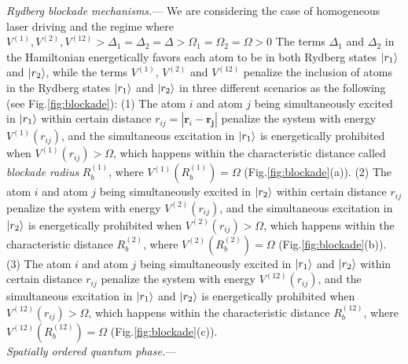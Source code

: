 \documentclass[%
 reprint,
nofootinbib,
 amsmath,amssymb,
 aps,
floatfix,
]{revtex4-2}
\begin{document}
\emph{Rydberg blockade mechanisms.}--- We are considering the case of homogeneous laser driving and the regime where $V^{(1)},V^{(2)},V^{(12)} > \Delta_1=\Delta_2 =\Delta > \Omega_1=\Omega_2=\Omega > 0$ The terms $\Delta_1$ and $\Delta_2$ in the Hamiltonian energetically favors each atom to be in both Rydberg states $\ket{r_1}$ and $\ket{r_2}$, while the terms $V^{(1)}$, $V^{(2)}$ and $V^{(12)}$ penalize the inclusion of atoms in the Rydberg states $\ket{r_1}$ and $\ket{r_2}$ in three different scenarios as the following (see Fig.\ref{fig:blockade}): (1) The atom $i$ and atom $j$ being simultaneously excited in $\ket{r_1}$ within certain distance $r_{ij}=|\boldsymbol{r}_i-\boldsymbol{r_j}|$ penalize the system with energy $V^{(1)}(r_{ij})$, and the simultaneous excitation in $\ket{r_1}$ is energetically prohibited when $V^{(1)}(r_{ij})>\Omega$, which happens within the characteristic distance called \emph{blockade radius} $R^{(1)}_b$, where $V^{(1)}(R^{(1)}_b)=\Omega$ (Fig.\ref{fig:blockade}(a)). (2) The atom $i$ and atom $j$ being simultaneously excited in $\ket{r_2}$ within certain distance $r_{ij}$ penalize the system with energy $V^{(2)}(r_{ij})$, and the simultaneous excitation in $\ket{r_2}$ is energetically prohibited when $V^{(2)}(r_{ij})>\Omega$, which happens within the characteristic distance $R^{(2)}_b$, where $V^{(2)}(R^{(2)}_b)=\Omega$ (Fig.\ref{fig:blockade}(b)). (3) The atom $i$ and atom $j$ being simultaneously excited in $\ket{r_1}$ and $\ket{r_2}$ within certain distance $r_{ij}$ penalize the system with energy $V^{(12)}(r_{ij})$, and the simultaneous excitation in $\ket{r_1}$ and $\ket{r_2}$ is energetically prohibited when $V^{(12)}(r_{ij})>\Omega$, which happens within the characteristic distance $R^{(12)}_b$, where $V^{(12)}(R^{(12)}_b)=\Omega$ (Fig.\ref{fig:blockade}(c)).\\

\emph{Spatially ordered quantum phase.}--- 
\end{document}
